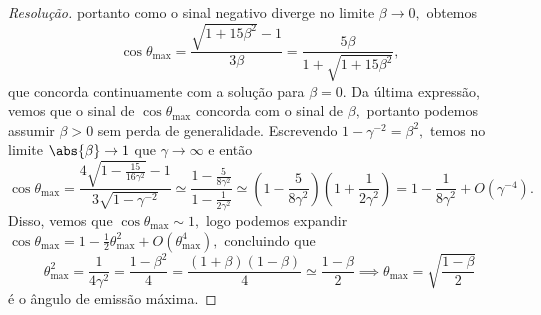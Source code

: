 \begin{proof}[Resolução]
    portanto como o sinal negativo diverge no limite \(\beta \to 0,\) obtemos
    \begin{equation*}
        \cos \theta_{\mathrm{max}} = \frac{\sqrt{1 + 15 \beta^2} - 1}{3\beta} = \frac{5 \beta}{1 + \sqrt{1 + 15 \beta^2}},
    \end{equation*}
    que concorda continuamente com a solução para \(\beta = 0.\) Da última expressão, vemos que o sinal de \(\cos\theta_{\mathrm{max}}\) concorda com o sinal de \(\beta,\) portanto podemos assumir \(\beta > 0\) sem perda de generalidade. Escrevendo \(1 - \gamma^{-2} = \beta^2,\) temos no limite \(\abs{\beta} \to 1\) que \(\gamma \to \infty\) e então
    \begin{equation*}
        \cos\theta_{\mathrm{max}} = \frac{4\sqrt{1 - \frac{15}{16 \gamma^2}} - 1}{3\sqrt{1 - \gamma^{-2}}} \simeq \frac{1 - \frac{5}{8 \gamma^2}}{1 - \frac{1}{2 \gamma^2}} \simeq \left(1 - \frac{5}{8 \gamma^2}\right)\left(1 + \frac{1}{2 \gamma^2}\right) = 1 - \frac{1}{8 \gamma^2} + O(\gamma^{-4}).
    \end{equation*}
    Disso, vemos que \(\cos\theta_{\mathrm{max}} \sim 1,\) logo podemos expandir \(\cos\theta_{\mathrm{max}} = 1 - \frac12 \theta_{\mathrm{max}}^2 + O(\theta_{\mathrm{max}}^4),\) concluindo que 
    \begin{equation*}
        \theta_{\mathrm{max}}^2 = \frac{1}{4 \gamma^2} = \frac{1 - \beta^2}{4} = \frac{(1 + \beta)(1 - \beta)}{4} \simeq \frac{1 - \beta}{2} \implies \theta_{\mathrm{max}} = \sqrt{\frac{1 - \beta}{2}}
    \end{equation*}
    é o ângulo de emissão máxima.
\end{proof}
